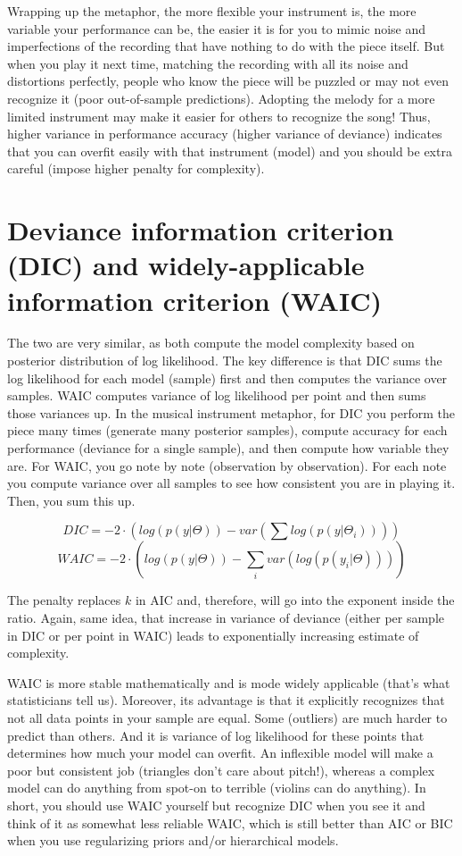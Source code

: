 \documentclass[
]{book}
\begin{document}
Wrapping up the metaphor, the more flexible your instrument is, the more variable your performance can be, the easier it is for you to mimic noise and imperfections of the recording that have nothing to do with the piece itself. But when you play it next time, matching the recording with all its noise and distortions perfectly, people who know the piece will be puzzled or may not even recognize it (poor out-of-sample predictions). Adopting the melody for a more limited instrument may make it easier for others to recognize the song! Thus, higher variance in performance accuracy (higher variance of deviance) indicates that you can overfit easily with that instrument (model) and you should be extra careful (impose higher penalty for complexity).

\hypertarget{deviance-information-criterion-dic-and-widely-applicable-information-criterion-waic}{%
\section{Deviance information criterion (DIC) and widely-applicable information criterion (WAIC)}\label{deviance-information-criterion-dic-and-widely-applicable-information-criterion-waic}}

The two are very similar, as both compute the model complexity based on posterior distribution of log likelihood. The key difference is that DIC sums the log likelihood for each model (sample) first and then computes the variance over samples. WAIC computes variance of log likelihood per point and then sums those variances up. In the musical instrument metaphor, for DIC you perform the piece many times (generate many posterior samples), compute accuracy for each performance (deviance for a single sample), and then compute how variable they are. For WAIC, you go note by note (observation by observation). For each note you compute variance over all samples to see how consistent you are in playing it. Then, you sum this up.

\[DIC = -2 \cdot \left( log(p(y|\Theta)) - var(\sum log(p(y|\Theta_i))) \right)\]
\[WAIC = -2 \cdot \left( log(p(y|\Theta)) - \sum_i var(log(p(y_i|\Theta))) \right)\]

The penalty replaces \(k\) in AIC and, therefore, will go into the exponent inside the ratio. Again, same idea, that increase in variance of deviance (either per sample in DIC or per point in WAIC) leads to exponentially increasing estimate of complexity.

WAIC is more stable mathematically and is mode widely applicable (that's what statisticians tell us). Moreover, its advantage is that it explicitly recognizes that not all data points in your sample are equal. Some (outliers) are much harder to predict than others. And it is variance of log likelihood for these points that determines how much your model can overfit. An inflexible model will make a poor but consistent job (triangles don't care about pitch!), whereas a complex model can do anything from spot-on to terrible (violins can do anything). In short, you should use WAIC yourself but recognize DIC when you see it and think of it as somewhat less reliable WAIC, which is still better than AIC or BIC when you use regularizing priors and/or hierarchical models.
\end{document}
